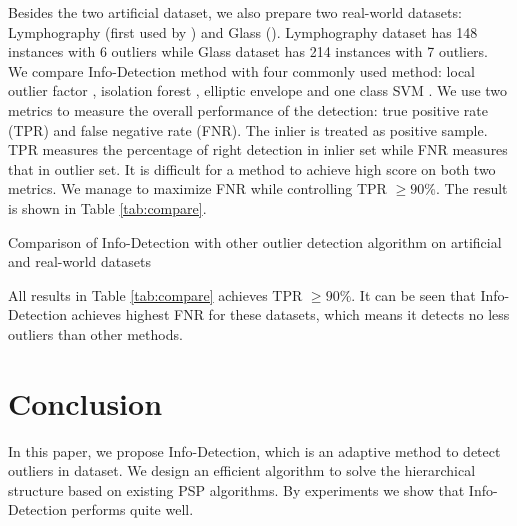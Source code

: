 \documentclass[runningheads]{llncs}
\begin{document}
Besides the two artificial dataset, we also prepare two real-world datasets: Lymphography (first used by \cite{Lazarevic}) and Glass (\cite{hics}). Lymphography dataset has 148 instances with 6 outliers while Glass dataset has 214 instances with 7 outliers. We compare Info-Detection method with four commonly used method: local outlier factor \cite{Breunig}, isolation forest \cite{if}, elliptic envelope \cite{rousseeuw1999fast} and one class SVM \cite{svm}. We use two metrics to measure the overall performance of the detection: true positive rate (TPR) and false negative rate (FNR). The inlier is treated as positive sample. TPR measures the percentage of right detection in inlier set while FNR measures that in outlier set. It is difficult for a method to achieve high score on both two metrics. We manage to maximize FNR while controlling TPR $\geq 90\%$. The result is shown in Table \ref{tab:compare}.
\begin{table}[!ht]
\centering
{}
\caption{Comparison of Info-Detection with other outlier detection algorithm on artificial and real-world datasets}\label{tab:compare}
\end{table}

All results in Table \ref{tab:compare} achieves TPR $\geq 90\%$. It can be seen that Info-Detection achieves highest FNR for these datasets, which means it detects no less outliers than other methods.

\section{Conclusion}\label{sec:Conclusion}
In this paper, we propose Info-Detection, which is an adaptive method to detect outliers in dataset. We design an efficient algorithm to solve the hierarchical structure based on existing PSP algorithms. By experiments we show that Info-Detection performs quite well.
%
%
%


%
\appendix
\end{document}
